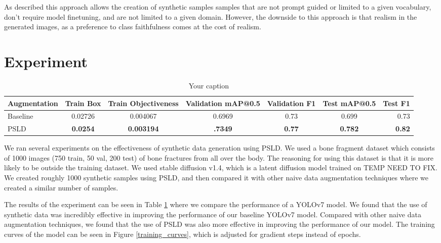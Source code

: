 \documentclass{article}
\begin{document}
As described this approach allows the creation of synthetic samples samples that are not prompt guided or limited to a given vocabulary, don't require model
finetuning, and are not limited to a given domain. However, the downside to this approach is that realism in the generated images, as a preference to class faithfulness
comes at the cost of realism.

\section{Experiment}

\begin{table}[t]
\centering
\caption{Your caption}
\label{results}
\begin{tabular}{lcccccr}
\toprule
Augmentation & Train Box & Train Objectiveness & Validation mAP@0.5 & Validation F1  & Test mAP@0.5 & Test F1 \\
\midrule
Baseline & 0.02726 & 0.004067 & 0.6969 & 0.73 & 0.699 & 0.73\\
PSLD & \textbf{0.0254} & \textbf{0.003194} & \textbf{.7349} &  \textbf{0.77} & \textbf{0.782} & \textbf{0.82} \\
\bottomrule
\end{tabular}
\end{table}

We ran several experiments on the effectiveness of synthetic data generation using PSLD. We used a bone fragment dataset which consists of 1000 images 
(750 train, 50 val, 200 test) of bone fractures from all over the body. The reasoning for using this dataset is that it is more likely to be outside the training
dataset. We used stable diffusion v1.4, which is a latent diffusion model trained on TEMP NEED TO FIX. We created roughly 1000 synthetic samples using PSLD, and then
compared it with other naive data augmentation techniques where we created a similar number of samples.

The results of the experiment can be seen in Table \ref{results} where we compare the performance of a YOLOv7 model. We found that the use of synthetic data
was incredibly effective in improving the performance of our baseline YOLOv7 model. Compared with other naive data augmentation techniques, we found that the use
of PSLD was also more effective in improving the performance of our model. The training curves of the model can be seen in Figure \ref{training_curves}, which is
adjusted for gradient steps instead of epochs.
\end{document}

